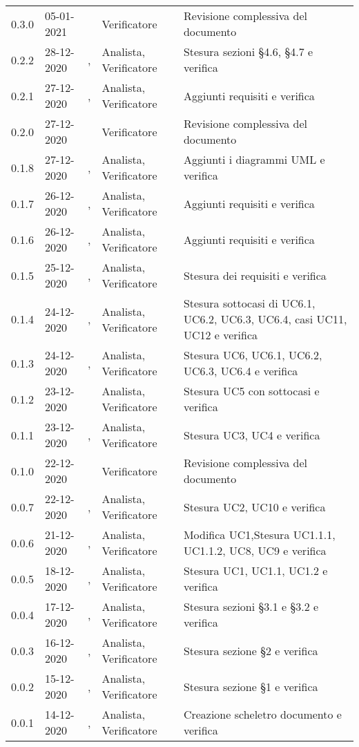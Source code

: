 {{\begin{longtable}{C{1.7cm} | C{2.5cm} | C{3.2cm} | C{2.7cm}  | C{4.8cm}}
0.3.0 & 05-01-2021 & \PA{} & Verificatore & Revisione complessiva del documento \\

0.2.2 & 28-12-2020 & \BM{}, \RA{} & Analista, Verificatore & Stesura sezioni §4.6, §4.7 e verifica\\
0.2.1 & 27-12-2020 & \SG{}, \RA{} & Analista, Verificatore & Aggiunti requisiti e verifica\\

0.2.0 & 27-12-2020 & \RA{} & Verificatore & Revisione complessiva del documento \\

0.1.8 & 27-12-2020 & \SP{}, \RA{} & Analista, Verificatore & Aggiunti i diagrammi UML e verifica\\
0.1.7 & 26-12-2020 & \SP{}, \PA{} & Analista, Verificatore & Aggiunti requisiti e verifica\\
0.1.6 & 26-12-2020 & \BM{}, \PA{} & Analista, Verificatore & Aggiunti requisiti e verifica\\
0.1.5 & 25-12-2020 & \SG{}, \PA{} & Analista, Verificatore & Stesura dei requisiti  e verifica\\
0.1.4 & 24-12-2020 & \SP{}, \RA{} & Analista, Verificatore & Stesura sottocasi di UC6.1, UC6.2, UC6.3, UC6.4, casi UC11, UC12 e verifica\\
0.1.3 & 24-12-2020 & \SG{}, \RA{} & Analista, Verificatore & Stesura UC6, UC6.1, UC6.2, UC6.3, UC6.4 e verifica\\
0.1.2 & 23-12-2020 & \SP{, \RA{}} & Analista, Verificatore & Stesura UC5 con sottocasi e verifica\\

0.1.1 & 23-12-2020 & \BM{}, \RA{} & Analista, Verificatore & Stesura UC3, UC4 e verifica\\

0.1.0 & 22-12-2020 & \PA{} & Verificatore & Revisione complessiva del documento \\

0.0.7 & 22-12-2020 & \SG{}, \PA{} & Analista, Verificatore & Stesura UC2, UC10 e verifica\\
0.0.6 & 21-12-2020 & \BM{}, \PA{} & Analista, Verificatore & Modifica UC1,\newline Stesura UC1.1.1, UC1.1.2, UC8, UC9 e verifica\\
0.0.5 & 18-12-2020 & \SP{}, \RA{} & Analista, Verificatore & Stesura UC1, UC1.1, UC1.2 e verifica\\
0.0.4 & 17-12-2020 & \SP{}, \RA{} & Analista, Verificatore & Stesura sezioni §3.1 e §3.2 e verifica\\	
0.0.3 & 16-12-2020 & \SP{}, \PA{} & Analista, Verificatore & Stesura sezione §2 e verifica\\
0.0.2 & 15-12-2020 & \SP{}, \PA{} & Analista, Verificatore & Stesura sezione §1 e verifica\\
0.0.1 & 14-12-2020 & \SP{}, \PA{} & Analista, Verificatore & Creazione scheletro documento e verifica\\
		
\end{longtable}
}
}

